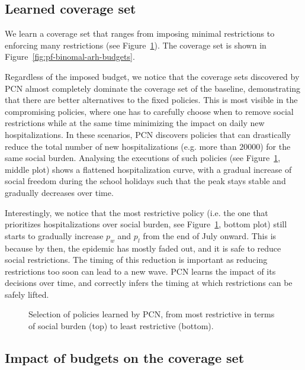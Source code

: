 \documentclass{article}
\begin{document}
\subsection{Learned coverage set}

We learn a coverage set that ranges from imposing minimal restrictions to enforcing many restrictions (see Figure~\ref{fig:policy-execution}). The coverage set is shown in Figure~\ref{fig:pf-binomal-arh-budgets}.

Regardless of the imposed budget, we notice that the coverage sets discovered by PCN almost completely dominate the coverage set of the baseline, demonstrating that there are better alternatives to the fixed policies. This is most visible in the compromising policies, where one has to carefully choose when to remove social restrictions while at the same time minimizing the impact on daily new hospitalizations. In these scenarios, PCN discovers policies that can drastically reduce the total number of new hospitalizations (e.g. more than $20000$) for the same social burden. Analysing the executions of such policies (see Figure~\ref{fig:policy-execution}, middle plot) shows a flattened hospitalization curve, with a gradual increase of social freedom during the school holidays such that the peak stays stable and gradually decreases over time.

Interestingly, we notice that the most restrictive policy (i.e. the one that prioritizes hospitalizations over social burden, see Figure~\ref{fig:policy-execution}, bottom plot) still starts to gradually increase $p_w$ and $p_l$ from the end of July onward. This is because by then, the epidemic has mostly faded out, and it is safe to reduce social restrictions. The timing of this reduction is important as reducing restrictions too soon can lead to a new wave. PCN learns the impact of its decisions over time, and correctly infers the timing at which restrictions can be safely lifted.

\begin{figure}
    \centering
    
    \caption{Selection of policies learned by PCN, from most restrictive in terms of social burden (top) to least restrictive (bottom).
    }
    \label{fig:policy-execution}
\end{figure}

\subsection{Impact of budgets on the coverage set}
\end{document}
